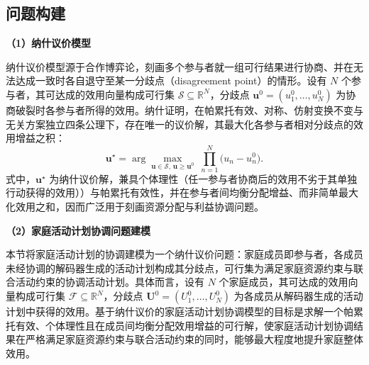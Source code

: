 \subsection{问题构建}\label{subsec.cohact.nash.problem}

\textbf{（1）纳什议价模型}

纳什议价模型源于合作博弈论\citep{nashBargainingProblem1950}，刻画多个参与者就一组可行结果进行协商、并在无法达成一致时各自退守至某一分歧点（disagreement point）的情形。设有 $N$ 个参与者，其可达成的效用向量构成可行集 $\mathcal{S}\subseteq\mathbb{R}^{N}$，分歧点 $\mathbf{u}^{0}=(u_1^{0},\dots,u_N^{0})$ 为协商破裂时各参与者所得的效用。纳什证明，在帕累托有效、对称、仿射变换不变与无关方案独立四条公理下，存在唯一的议价解，其最大化各参与者相对分歧点的效用增益之积：
\begin{equation}
\mathbf{u}^{\star}=\arg\max_{\mathbf{u}\in\mathcal{S},\,\mathbf{u}\ge\mathbf{u}^{0}}\;\prod_{n=1}^{N}\bigl(u_n-u_n^{0}\bigr).
\label{eq.cohact.nashclassic}
\end{equation}
式中，$\mathbf{u}^{\star}$ 为纳什议价解，兼具个体理性（任一参与者协商后的效用不劣于其单独行动获得的效用））与帕累托有效性，并在参与者间均衡分配增益、而非简单最大化效用之和，因而广泛用于刻画资源分配与利益协调问题。

\textbf{（2）家庭活动计划协调问题建模}

本节将家庭活动计划的协调建模为一个纳什议价问题：家庭成员即参与者，各成员未经协调的解码器生成的活动计划构成其分歧点，可行集为满足家庭资源约束与联合活动约束的协调活动计划。具体而言，设有 $N$ 个家庭成员，其可达成的效用向量构成可行集 $\mathcal{F}\subseteq\mathbb{R}^{N}$，分歧点 $\mathbf{U}^{0}=(U_1^{0},\dots,U_N^{0})$ 为各成员从解码器生成的活动计划中获得的效用。基于纳什议价的家庭活动计划协调模型的目标是求解一个帕累托有效、个体理性且在成员间均衡分配效用增益的可行解，使家庭活动计划协调结果在严格满足家庭资源约束与联合活动约束的同时，能够最大程度地提升家庭整体效用。

